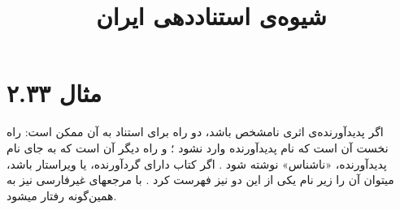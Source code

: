 \documentclass[a4paper,10pt]{article}
\def\examplenumber{مثال ۲.۳۳}
\begin{document}
\title{شیوه‌ی استناددهی ایران}
\author{}
\date{}
\maketitle



\section*{\examplenumber}

اگر پدیدآورنده‌ی اثری نامشخص باشد، دو راه برای استناد به آن ممکن است: راه نخست آن است که نام پدیدآورنده وارد نشود \cite[مانند][]{هزارویک1378}؛ و راه دیگر آن است که به جای نام پدیدآورنده، «ناشناس» نوشته شود \cite[مانند][]{ناشناس1378,ناشناس1362}. اگر کتاب دارای گردآورنده، یا ویراستار باشد، میتوان آن را زیر نام یکی از این دو نیز فهرست کرد \cite[مانند][]{افراسیابی1378}. با مرجعهای غیرفارسی نیز به همین‌گونه رفتار میشود.
\nocite{*}






\end{document}
